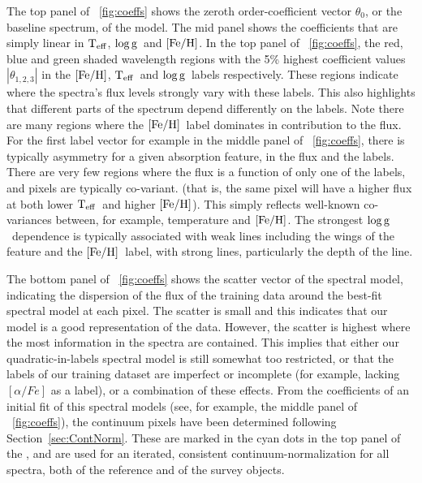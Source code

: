 \documentclass[12pt, preprint]{aastex}
\newcommand{\sectionname}{Section}
\newcommand{\teff}{\mbox{$\rm T_{eff}$}}
\newcommand{\feh}{\mbox{$\rm [Fe/H]$}}
\newcommand{\logg}{\mbox{$\rm \log g$}}
\begin{document}
The top panel of \figurename~\ref{fig:coeffs} shows the zeroth order-coefficient vector $\theta_0$, or the baseline spectrum, of the model. 
The mid panel shows the coefficients that are simply linear in \teff, \logg\ and \feh.
In the top panel of \figurename~\ref{fig:coeffs}, the red, blue and green shaded wavelength regions with the 5\% 
highest coefficient values $|\theta_{1,2,3}|$ in the \feh, \teff\ and \logg\ labels respectively. 
These regions indicate where the spectra's flux levels strongly vary with these labels.
This also highlights that different parts of the spectrum depend differently on the labels. Note there are many regions where the \feh\ label dominates in contribution to the flux.
For the first label vector for example in the middle panel of \figurename~\ref{fig:coeffs}, 
there is typically asymmetry for a given absorption feature, in the flux and the labels. 
There are very few regions where the flux is a function of only one of the labels, and pixels are typically co-variant. 
(that is, the same pixel will have a higher flux at both lower \teff\ and higher \feh). 
This simply reflects well-known co-variances between, for example, temperature and \feh .
The strongest \logg\ dependence is typically associated with weak lines including the wings of the 
feature and the \feh\ label, with strong lines, particularly the depth of the line. 

The bottom panel of \figurename~\ref{fig:coeffs} shows the scatter vector of the spectral model, 
indicating the dispersion of the flux of the training data around the best-fit spectral model at each pixel. 
The scatter is small and this indicates that our model is a good representation of the data. 
However, the scatter is highest where the most information in the spectra are contained. 
This implies that either our quadratic-in-labels spectral model is still somewhat too restricted, or that the labels of our training dataset are imperfect or incomplete 
(for example, lacking $[\alpha / Fe]$ as a label), or a combination of these effects. 
From the coefficients of an initial fit of this spectral models (see, for example, the middle panel of \figurename~\ref{fig:coeffs}), 
the continuum pixels have been determined following \sectionname~\ref{sec:ContNorm}. 
These are marked in the cyan dots in the top panel of the \figurename, and are used for an iterated, 
consistent continuum-normalization for all spectra, both of the reference and of the survey objects.
\end{document}
